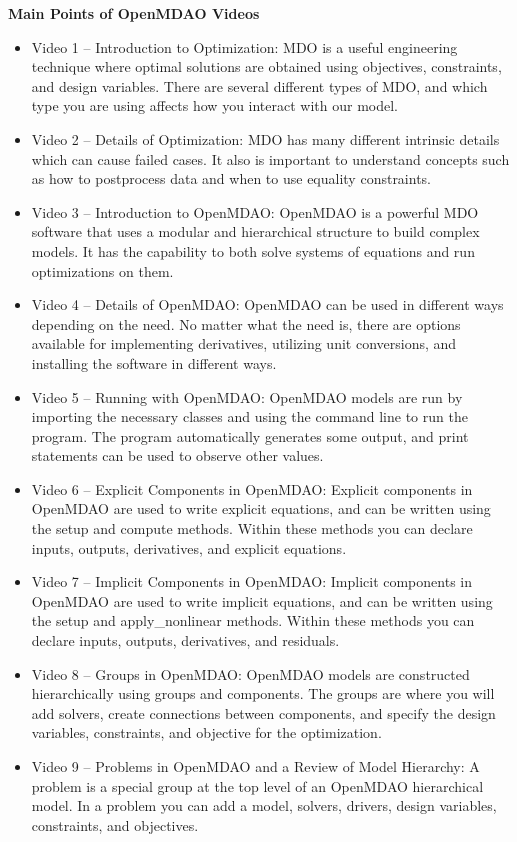 \documentclass[12pt, letterpaper]{article}
\begin{document}
\centerline{\textbf{Main Points of OpenMDAO Videos}}

\begin{itemize}
	\item Video 1 – Introduction to Optimization: MDO is a useful engineering technique where optimal solutions are obtained using objectives, constraints, and design variables. There are several different types of MDO, and which type you are using affects how you interact with our model.
	\item Video 2 – Details of Optimization: MDO has many different intrinsic details which can cause failed cases. It also is important to understand concepts such as how to postprocess data and when to use equality constraints.
	\item Video 3 – Introduction to OpenMDAO: OpenMDAO is a powerful MDO software that uses a modular and hierarchical structure to build complex models. It has the capability to both solve systems of equations and run optimizations on them.
	\item Video 4 – Details of OpenMDAO: OpenMDAO can be used in different ways depending on the need. No matter what the need is, there are options available for implementing derivatives, utilizing unit conversions, and installing the software in different ways.
	\item Video 5 – Running with OpenMDAO: OpenMDAO models are run by importing the necessary classes and using the command line to run the program. The program automatically generates some output, and print statements can be used to observe other values.
	\item Video 6 – Explicit Components in OpenMDAO: Explicit components in OpenMDAO are used to write explicit equations, and can be written using the setup and compute methods. Within these methods you can declare inputs, outputs, derivatives, and explicit equations.
	\item Video 7 – Implicit Components in OpenMDAO: Implicit components in OpenMDAO are used to write implicit equations, and can be written using the setup and apply\_nonlinear methods. Within these methods you can declare inputs, outputs, derivatives, and residuals.
	\item Video 8 – Groups in OpenMDAO: OpenMDAO models are constructed hierarchically using groups and components. The groups are where you will add solvers, create connections between components, and specify the design variables, constraints, and objective for the optimization.
	\item Video 9 – Problems in OpenMDAO and a Review of Model Hierarchy: A problem is a special group at the top level of an OpenMDAO hierarchical model. In a problem you can add a model, solvers, drivers, design variables, constraints, and objectives.

\end{itemize}
\end{document}
